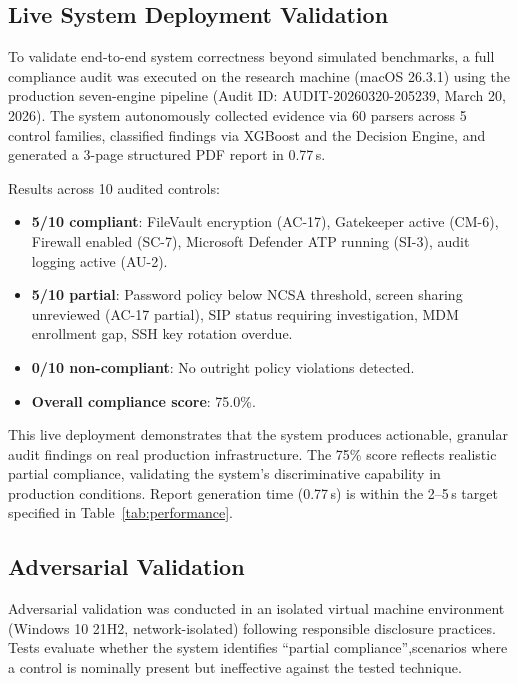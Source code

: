 \documentclass[futureinternet,article,submit,pdftex,moreauthors]{Definitions/mdpi}
\begin{document}
\subsection{Live System Deployment Validation}
\label{sec:live_deployment}

To validate end-to-end system correctness beyond simulated benchmarks, a full compliance audit
was executed on the research machine (macOS 26.3.1) using the production seven-engine pipeline
(Audit ID: AUDIT-20260320-205239, March 20, 2026). The system autonomously collected evidence
via 60 parsers across 5 control families, classified findings via XGBoost and the Decision
Engine, and generated a 3-page structured PDF report in 0.77\,s.

Results across 10 audited controls:
\begin{itemize}
\item \textbf{5/10 compliant}: FileVault encryption (AC-17), Gatekeeper active (CM-6),
Firewall enabled (SC-7), Microsoft Defender ATP running (SI-3), audit logging active (AU-2).
\item \textbf{5/10 partial}: Password policy below NCSA threshold, screen sharing unreviewed
(AC-17 partial), SIP status requiring investigation, MDM enrollment gap, SSH key rotation
overdue.
\item \textbf{0/10 non-compliant}: No outright policy violations detected.
\item \textbf{Overall compliance score}: 75.0\%.
\end{itemize}

This live deployment demonstrates that the system produces actionable, granular audit findings
on real production infrastructure. The 75\% score reflects realistic partial compliance,
validating the system's discriminative capability in production conditions. Report generation
time (0.77\,s) is within the 2--5\,s target specified in Table~\ref{tab:performance}.

\subsection{Adversarial Validation}
\label{sec:adversarial}

Adversarial validation was conducted in an isolated virtual machine environment (Windows 10
21H2, network-isolated) following responsible disclosure practices. Tests evaluate whether the
system identifies ``partial compliance'',scenarios where a control is nominally present but
ineffective against the tested technique.
\end{document}
